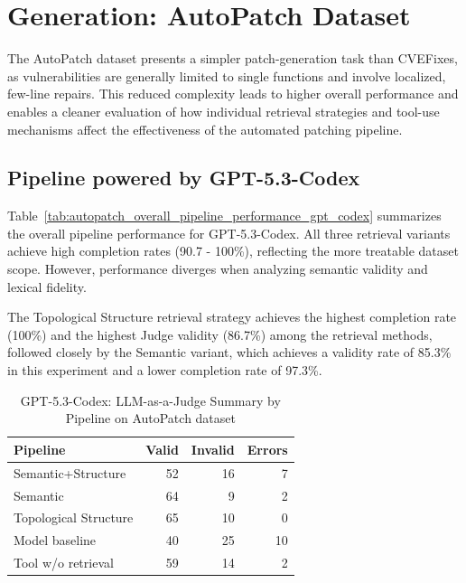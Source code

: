 \section{Generation: AutoPatch Dataset}

The AutoPatch dataset presents a simpler patch-generation task than CVEFixes, as vulnerabilities are generally limited to single functions and involve localized, few-line repairs. 
This reduced complexity leads to higher overall performance and enables a cleaner evaluation of how individual retrieval strategies and tool-use mechanisms affect the effectiveness of the automated patching pipeline.


\subsection{Pipeline powered by GPT-5.3-Codex}

Table~\ref{tab:autopatch_overall_pipeline_performance_gpt_codex} summarizes the overall pipeline performance for GPT-5.3-Codex. All three retrieval variants achieve high completion rates (90.7 - 100\%), reflecting the more treatable dataset scope. However, performance diverges when analyzing semantic validity and lexical fidelity.

The Topological Structure retrieval strategy achieves the highest completion rate (100\%) and the highest Judge validity (86.7\%) among the retrieval methods, followed closely by the Semantic variant, which achieves a validity rate of 85.3\% in this experiment and a lower completion rate of 97.3\%. 

\begin{table}[h]
  \centering
  \small
  \caption{GPT-5.3-Codex: LLM-as-a-Judge Summary by Pipeline on AutoPatch dataset}
  \label{tab:llmjudge_autopatch_codex}
  \begin{tabular}{lrrr}
    \toprule
    \textbf{Pipeline} & \textbf{Valid} & \textbf{Invalid} & \textbf{Errors} \\
    \midrule
    Semantic+Structure & 52 & 16 & 7 \\
    Semantic  & 64 & 9 & 2 \\
    Topological Structure & 65 & 10 & 0 \\
    Model baseline & 40 & 25 & 10 \\
    Tool w/o retrieval & 59 & 14 & 2 \\
    \bottomrule
  \end{tabular}
  
\end{table}


